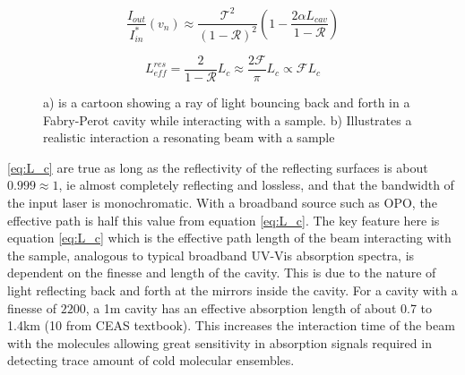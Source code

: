 \documentclass[11pt,a4paper]{book}
\newcommand{\imginput}[1]{} %
\begin{document}
		\begin{equation} 
			\label{eq:CEAS}
			\dfrac{I_{out}}{I_{in}^*}(v_n) \approx \dfrac{\mathcal{T}^2 }{({1 - \mathcal{R}})^2}  
			\left(
				1 - \dfrac{2 \alpha L_{cav}}{1-\mathcal{R}}
			\right)
		\end{equation}
		
		\begin{equation} 
			\label{eq:L_c}
			L_{eff}^{res}=\dfrac{2}{1-\mathcal{R}} L_c 
			\approx
			\dfrac{2\mathcal{F}}{\pi} L_c
			\propto \mathcal{F}L_c
		\end{equation}		
		
		\begin{figure} [!ht]
			\centering
			\def\svgwidth{\columnwidth}
			\resizebox{14.5cm}{!}{\imginput{images/CEAS-cartoon.pdf_tex}}
			\label{fig:CEAS}
			\caption{a) is a cartoon showing a ray of light bouncing back and forth in a Fabry-Perot cavity while interacting with a sample. b) Illustrates a realistic interaction a resonating beam with a sample }
		\end{figure}
		
		\noindent
		\autoref{eq:L_c} are true as long as the reflectivity of the reflecting surfaces is about $0.999 \approx 1$, ie almost completely reflecting and lossless, and that the bandwidth of the input laser is monochromatic. With a broadband source such as OPO, the effective path is half this value from equation \autoref{eq:L_c}. 
		The key feature here is equation \autoref{eq:L_c} which is the effective path length of the beam interacting with the sample, analogous to typical broadband UV-Vis absorption spectra, is dependent on the finesse and length of the cavity. 
		This is due to the nature of light reflecting back and forth at the mirrors inside the cavity. For a cavity with a finesse of $2200$, a 1m cavity has an effective absorption length of about 0.7 to 1.4km (10 from CEAS textbook). 
		This increases the interaction time of the beam with the molecules allowing great sensitivity in absorption signals required in detecting trace amount of cold molecular ensembles.
	
\end{document}
